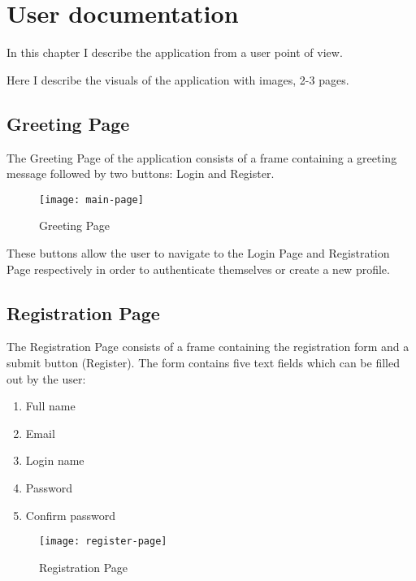 \chapter{User documentation}\label{ch:BASIC}

\begin{summary}
	In this chapter I describe the application from a user point of view.
\end{summary}

Here I describe the visuals of the application with images, 2-3 pages.

	\section{Greeting Page}

		The Greeting Page of the application consists of a frame containing a greeting message followed by two buttons: Login and Register.
		\begin{figure}[H]
			\centering
			\texttt{[image: main-page]}				
			\caption{Greeting Page}
		\end{figure}
		These buttons allow the user to navigate to the Login Page and Registration Page respectively in order to authenticate themselves or create a new profile.

	\section{Registration Page}

	The Registration Page consists of a frame containing the registration form and a submit button (Register).
	The form contains five text fields which can be filled out by the user:
		\begin{enumerate}
			\item Full name
			\item Email
			\item Login name
			\item Password
			\item Confirm password
		\end{enumerate}

		\begin{figure}[H]
			\centering
			\texttt{[image: register-page]}				
			\caption{Registration Page}
		\end{figure}

